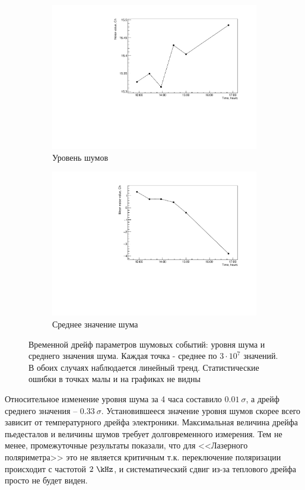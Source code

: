 \begin{figure}[h]
	\centering
	\begin{subfigure}{.5\textwidth}
		\centering
		\includegraphics[width=1\linewidth]{img/Noise_time_drift.pdf}
		\caption{Уровень шумов}
	\end{subfigure}%
	\begin{subfigure}{.5\textwidth}
		\centering
		\includegraphics[width=1\linewidth]{img/Mean_time_drift.pdf}
		\caption{Среднее значение шума}
	\end{subfigure}
	\caption{Временной дрейф параметров шумовых событий: уровня шума и среднего значения шума. Каждая точка - среднее по $3\cdot10^7$ значений. В обоих случаях наблюдается линейный тренд. Статистические ошибки в точках малы и на графиках не видны}
	\label{fig:Noise_gr}
\end{figure}
Относительное изменение уровня шума за 4 часа составило $0.01~\sigma$, а дрейф среднего значения -- $0.33~\sigma$. Установившееся значение уровня шумов скорее всего зависит от температурного дрейфа электроники. Максимальная величина дрейфа пьедесталов и величины шумов требует долговременного измерения. Тем не менее, промежуточные результаты показали, что для <<Лазерного поляриметра>> это не является критичным т.к. переключение поляризации происходит с частотой $2~\kHz$, и систематический сдвиг из-за теплового дрейфа просто не будет виден. 

